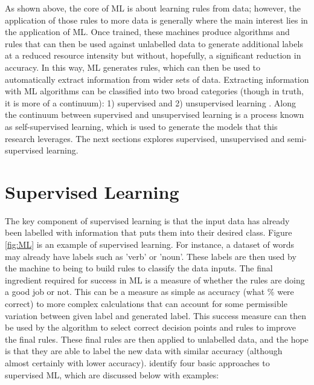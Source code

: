 As shown above, the core of ML is about learning rules from data; however, the application of those rules to more data is generally where the main interest lies in the application of ML. Once trained, these machines produce algorithms and rules that can then be used against unlabelled data to generate additional labels at a reduced resource intensity but without, hopefully, a significant reduction in accuracy. In this way, ML generates rules, which can then be used to automatically extract information from wider sets of data. Extracting information with ML algorithms can be classified into two broad categories (though in truth, it is more of a continuum): 1) supervised and 2) unsupervised learning  \parencite{chollet_allaire_2018}. Along the continuum between supervised and unsupervised learning is a process known as self-supervised learning, which is used to generate the models that this research leverages. The next sections explores supervised, unsupervised and semi-supervised learning.

\section{Supervised Learning} The key component of supervised learning is that the input data has already been labelled with information that puts them into their desired class.  Figure \ref{fig:ML} is an example of supervised learning. For instance, a dataset of words may already have labels such as ’verb’ or ’noun’. These labels are then used by the machine to being to build rules to classify the data inputs. The final ingredient required for success in ML is a measure of whether the rules are doing a good job or not. This can be a measure as simple as accuracy (what \% were correct) to more complex calculations that can account for some permissible variation between given label and generated label. This success measure can then be used by the algorithm to select correct decision points and rules to improve the final rules. These final rules are then applied to unlabelled data, and the hope is that they are able to label the new data with similar accuracy (although almost certainly with lower accuracy). \textcite{chollet_allaire_2018} identify four basic approaches to supervised ML, which are discussed below with examples:


